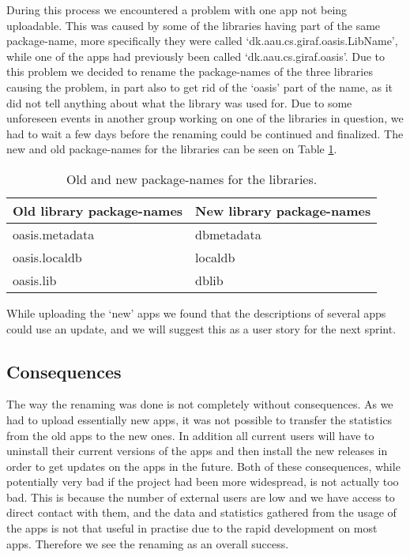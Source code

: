 During this process we encountered a problem with one app not being uploadable. This was caused by some of the libraries having part of the same package-name, more specifically they were called ‘dk.aau.cs.giraf.oasis.LibName’, while one of the apps had previously been called ‘dk.aau.cs.giraf.oasis’. Due to this problem we decided to rename the package-names of the three libraries causing the problem, in part also to get rid of the ‘oasis’ part of the name, as it did not tell anything about what the library was used for. Due to some unforeseen events in another group working on one of the libraries in question, we had to wait a few days before the renaming could be continued and finalized. The new and old package-names for the libraries can be seen on Table \ref{Sprint3_package_names_libraries}.

\begin{table}
	\centering
	\begin{tabular}{ll}
		\textbf{Old library package-names} & \textbf{New library package-names}\\ \hline \noalign{\vskip 2mm}
		oasis.metadata & dbmetadata\\ \hline
		oasis.localdb & localdb\\ \hline
		oasis.lib & dblib\\ \hline
	\end{tabular}
	\caption{Old and new package-names for the libraries.}
	\label{Sprint3_package_names_libraries}
\end{table}

While uploading the ‘new’ apps we found that the descriptions of several apps could use an update, and we will suggest this as a user story for the next sprint.

\subsection{Consequences}
The way the renaming was done is not completely without consequences. As we had to upload essentially new apps, it was not possible to transfer the statistics from the old apps to the new ones. In addition all current users will have to uninstall their current versions of the apps and then install the new releases in order to get updates on the apps in the future. Both of these consequences, while potentially very bad if the project had been more widespread, is not actually too bad. This is because the number of external users are low and we have access to direct contact with them, and the data and statistics gathered from the usage of the apps is not that useful in practise due to the rapid development on most apps. Therefore we see the renaming as an overall success.

